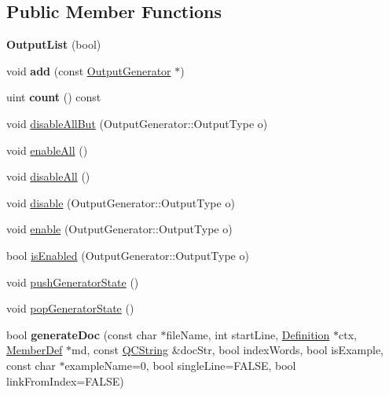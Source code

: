 \subsection*{Public Member Functions}
\begin{DoxyCompactItemize}
\item 
\mbox{\label{class_output_list_aa4820a09b009817bb03d3bbf883b7875}} 
{\bfseries Output\+List} (bool)
\item 
\mbox{\label{class_output_list_a59f42f9a70314fbc4edd78d44f9d163d}} 
void {\bfseries add} (const \mbox{\hyperlink{class_output_generator}{Output\+Generator}} $\ast$)
\item 
\mbox{\label{class_output_list_af8fc47fb6897206ffc64d956355a3d89}} 
uint {\bfseries count} () const
\item 
void \mbox{\hyperlink{class_output_list_a73f9be626eea01f1ccd1b446dcf2c003}{disable\+All\+But}} (Output\+Generator\+::\+Output\+Type o)
\item 
void \mbox{\hyperlink{class_output_list_ad32603ff4c4ba4d39e0bad7ede5924bf}{enable\+All}} ()
\item 
void \mbox{\hyperlink{class_output_list_a6a75284d21a037302ea3d7dc6e1558d4}{disable\+All}} ()
\item 
void \mbox{\hyperlink{class_output_list_a22f8c17b8c14518aa55f8af3c2abab0f}{disable}} (Output\+Generator\+::\+Output\+Type o)
\item 
void \mbox{\hyperlink{class_output_list_a4006394472d6c49f7db435628832c49d}{enable}} (Output\+Generator\+::\+Output\+Type o)
\item 
bool \mbox{\hyperlink{class_output_list_a63a7bebe83b904d00b2350863c7c7399}{is\+Enabled}} (Output\+Generator\+::\+Output\+Type o)
\item 
void \mbox{\hyperlink{class_output_list_a885957a64f7d87aefb663c4ec903188f}{push\+Generator\+State}} ()
\item 
void \mbox{\hyperlink{class_output_list_a94eb1af2ea07425ef1faa539d24adcf8}{pop\+Generator\+State}} ()
\item 
\mbox{\label{class_output_list_a344adfca4d8515fcef66a4d96e1454f3}} 
bool {\bfseries generate\+Doc} (const char $\ast$file\+Name, int start\+Line, \mbox{\hyperlink{class_definition}{Definition}} $\ast$ctx, \mbox{\hyperlink{class_member_def}{Member\+Def}} $\ast$md, const \mbox{\hyperlink{class_q_c_string}{Q\+C\+String}} \&doc\+Str, bool index\+Words, bool is\+Example, const char $\ast$example\+Name=0, bool single\+Line=F\+A\+L\+SE, bool link\+From\+Index=F\+A\+L\+SE)

\end{DoxyCompactItemize}
